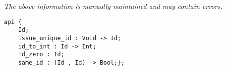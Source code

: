 \label{api:Issue\_Unique\_Id}

{\tiny \it The above information is manually maintained and may contain errors.}
\begin{verbatim}
api {
    Id;
    issue_unique_id : Void -> Id;
    id_to_int : Id -> Int;
    id_zero : Id;
    same_id : (Id , Id) -> Bool;};
\end{verbatim}
